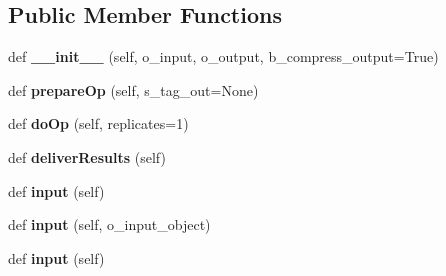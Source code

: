 \subsection*{Public Member Functions}
\begin{DoxyCompactItemize}
\item 
def {\bfseries \+\_\+\+\_\+init\+\_\+\+\_\+} (self, o\+\_\+input, o\+\_\+output, b\+\_\+compress\+\_\+output=True)\hypertarget{classpgopsimupop_1_1PGOpSimuPop_a1b050e5986d48aefb759eccaa8d2f63c}{}\label{classpgopsimupop_1_1PGOpSimuPop_a1b050e5986d48aefb759eccaa8d2f63c}

\item 
def {\bfseries prepare\+Op} (self, s\+\_\+tag\+\_\+out=None)\hypertarget{classpgopsimupop_1_1PGOpSimuPop_a1f9f4009f82dbd2e8ffda716a7cc03e2}{}\label{classpgopsimupop_1_1PGOpSimuPop_a1f9f4009f82dbd2e8ffda716a7cc03e2}

\item 
def {\bfseries do\+Op} (self, replicates=1)\hypertarget{classpgopsimupop_1_1PGOpSimuPop_a14c5fac810542544bdd168247983db95}{}\label{classpgopsimupop_1_1PGOpSimuPop_a14c5fac810542544bdd168247983db95}

\item 
def {\bfseries deliver\+Results} (self)\hypertarget{classpgopsimupop_1_1PGOpSimuPop_aed98942907d7bba96b5447cc51fdfc45}{}\label{classpgopsimupop_1_1PGOpSimuPop_aed98942907d7bba96b5447cc51fdfc45}

\item 
def {\bfseries input} (self)\hypertarget{classpgopsimupop_1_1PGOpSimuPop_a10ac1995acab55bcb35f7c3029f64f6b}{}\label{classpgopsimupop_1_1PGOpSimuPop_a10ac1995acab55bcb35f7c3029f64f6b}

\item 
def {\bfseries input} (self, o\+\_\+input\+\_\+object)\hypertarget{classpgopsimupop_1_1PGOpSimuPop_a5a6fcc2321704267e5d9061dca9da3a4}{}\label{classpgopsimupop_1_1PGOpSimuPop_a5a6fcc2321704267e5d9061dca9da3a4}

\item 
def {\bfseries input} (self)\hypertarget{classpgopsimupop_1_1PGOpSimuPop_a10ac1995acab55bcb35f7c3029f64f6b}{}\label{classpgopsimupop_1_1PGOpSimuPop_a10ac1995acab55bcb35f7c3029f64f6b}

\end{DoxyCompactItemize}



